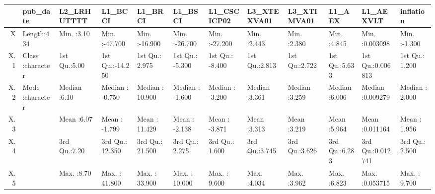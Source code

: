\begin{table}[ht]
\centering
\begin{tabular}{rlllllllllll}
  \hline
 &   pub\_date &  L2\_LRHUTTTT &    L1\_BCCI &    L1\_BRCI &    L1\_BSCI &  L1\_CSCICP02 &  L3\_XTEXVA01 &  L3\_XTIMVA01 &     L1\_AEX &   L1\_AEXVLT &   inflation \\ 
  \hline
X & Length:434         & Min.   :3.10   & Min.   :-47.700   & Min.   :-16.900   & Min.   :-26.700   & Min.   :-27.200   & Min.   :2.443   & Min.   :2.380   & Min.   :4.845   & Min.   :0.003098   & Min.   :-1.300   \\ 
  X.1 & Class :character   & 1st Qu.:5.00   & 1st Qu.:-14.250   & 1st Qu.:  2.975   & 1st Qu.: -5.300   & 1st Qu.: -8.400   & 1st Qu.:2.813   & 1st Qu.:2.722   & 1st Qu.:5.633   & 1st Qu.:0.006813   & 1st Qu.: 1.200   \\ 
  X.2 & Mode  :character   & Median :6.10   & Median : -0.750   & Median : 10.900   & Median : -1.600   & Median : -3.200   & Median :3.361   & Median :3.259   & Median :6.006   & Median :0.009279   & Median : 2.000   \\ 
  X.3 &  & Mean   :6.07   & Mean   : -1.799   & Mean   : 11.429   & Mean   : -2.138   & Mean   : -3.871   & Mean   :3.313   & Mean   :3.219   & Mean   :5.964   & Mean   :0.011164   & Mean   : 1.956   \\ 
  X.4 &  & 3rd Qu.:7.20   & 3rd Qu.: 12.350   & 3rd Qu.: 21.500   & 3rd Qu.:  2.275   & 3rd Qu.:  1.600   & 3rd Qu.:3.745   & 3rd Qu.:3.626   & 3rd Qu.:6.283   & 3rd Qu.:0.012741   & 3rd Qu.: 2.500   \\ 
  X.5 &  & Max.   :8.70   & Max.   : 41.800   & Max.   : 33.900   & Max.   : 10.000   & Max.   :  9.600   & Max.   :4.034   & Max.   :3.962   & Max.   :6.823   & Max.   :0.053715   & Max.   : 9.700   \\ 
   \hline
\end{tabular}
\end{table}
